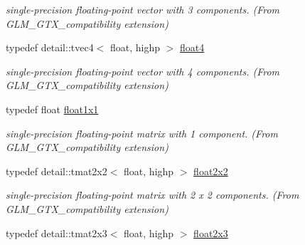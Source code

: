\begin{CompactItemize}
\begin{CompactList}\small\item\em single-precision floating-point vector with 3 components. (From GLM\_\-GTX\_\-compatibility extension) \item\end{CompactList}\item 
\hypertarget{group__gtx__compatibility_gc0676d140051809309ca683c325bf439}{
typedef detail::tvec4$<$ float, highp $>$ \hyperlink{group__gtx__compatibility_gc0676d140051809309ca683c325bf439}{float4}}
\label{group__gtx__compatibility_gc0676d140051809309ca683c325bf439}

\begin{CompactList}\small\item\em single-precision floating-point vector with 4 components. (From GLM\_\-GTX\_\-compatibility extension) \item\end{CompactList}\item 
\hypertarget{group__gtx__compatibility_gac1faa940ac1fbb32d4a315005b578af}{
typedef float \hyperlink{group__gtx__compatibility_gac1faa940ac1fbb32d4a315005b578af}{float1x1}}
\label{group__gtx__compatibility_gac1faa940ac1fbb32d4a315005b578af}

\begin{CompactList}\small\item\em single-precision floating-point matrix with 1 component. (From GLM\_\-GTX\_\-compatibility extension) \item\end{CompactList}\item 
\hypertarget{group__gtx__compatibility_ga4a1e4449913b2437f12434ed713dd73}{
typedef detail::tmat2x2$<$ float, highp $>$ \hyperlink{group__gtx__compatibility_ga4a1e4449913b2437f12434ed713dd73}{float2x2}}
\label{group__gtx__compatibility_ga4a1e4449913b2437f12434ed713dd73}

\begin{CompactList}\small\item\em single-precision floating-point matrix with 2 x 2 components. (From GLM\_\-GTX\_\-compatibility extension) \item\end{CompactList}\item 
\hypertarget{group__gtx__compatibility_gf6c91675c075853da392b1d2dfc45f65}{
typedef detail::tmat2x3$<$ float, highp $>$ \hyperlink{group__gtx__compatibility_gf6c91675c075853da392b1d2dfc45f65}{float2x3}}
\label{group__gtx__compatibility_gf6c91675c075853da392b1d2dfc45f65}


\end{CompactItemize}

